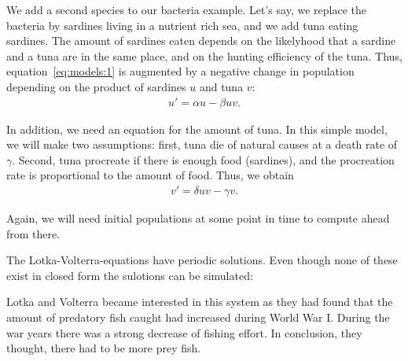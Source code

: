 \begin{example}
  We add a second species to our bacteria example. Let's say, we
  replace the bacteria by sardines living in a nutrient rich sea, and
  we add tuna eating sardines. The amount of sardines eaten depends on
  the likelyhood that a sardine and a tuna are in the same place, and
  on the hunting efficiency of the tuna. Thus,
  equation~\eqref{eq:models:1} is augmented by a negative change in
  population depending on the product of sardines $u$ and tuna $v$:
  \begin{gather*}
    u' = \alpha u - \beta u v.
  \end{gather*}

  In addition, we need an equation for the amount of tuna. In this
  simple model, we will make two assumptions: first, tuna die of
  natural causes at a death rate of $\gamma$. Second, tuna procreate
  if there is enough food (sardines), and the procreation rate is
  proportional to the amount of food. Thus, we obtain
  \begin{gather*}
    v' = \delta u v - \gamma v.
  \end{gather*}

  Again, we will need initial populations at some point in time to
  compute ahead from there.
\end{example}

\begin{remark}
  The Lotka-Volterra-equations have periodic solutions. Even though
  none of these exist in closed form the sulotions can be simulated:
  \begin{center}
  \end{center}
  Lotka and Volterra became interested in this system as they had
  found that the amount of predatory fish caught had increased
  during World War I. During the war years there was a strong
  decrease of fishing effort. In conclusion, they thought, there had
  to be more prey fish.  
\end{remark}

